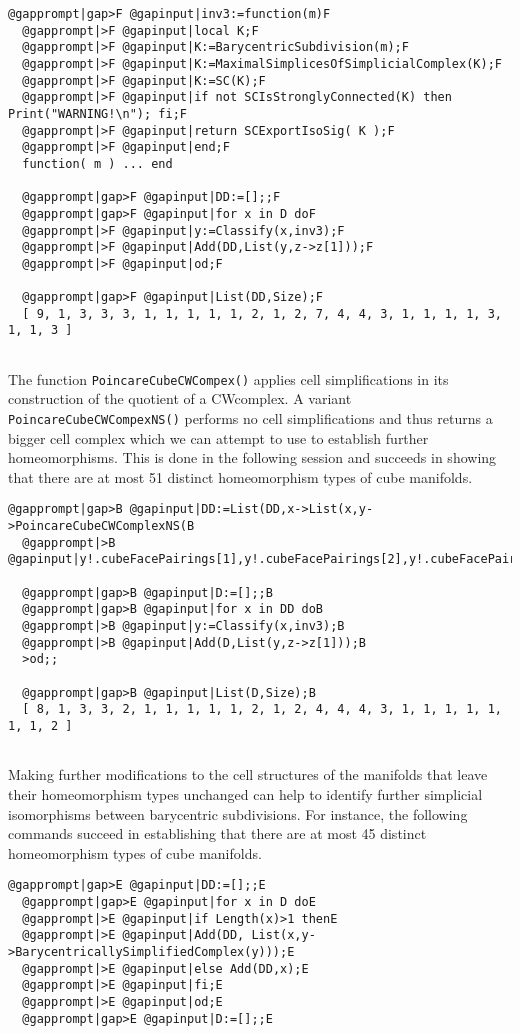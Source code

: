 \documentclass[a4paper,11pt]{report}
\begin{document}
{{\begin{Verbatim}[commandchars=@|F,fontsize=\small,frame=single,label=Example]
  @gapprompt|gap>F @gapinput|inv3:=function(m)F
  @gapprompt|>F @gapinput|local K;F
  @gapprompt|>F @gapinput|K:=BarycentricSubdivision(m);F
  @gapprompt|>F @gapinput|K:=MaximalSimplicesOfSimplicialComplex(K);F
  @gapprompt|>F @gapinput|K:=SC(K);F
  @gapprompt|>F @gapinput|if not SCIsStronglyConnected(K) then Print("WARNING!\n"); fi;F
  @gapprompt|>F @gapinput|return SCExportIsoSig( K );F
  @gapprompt|>F @gapinput|end;F
  function( m ) ... end
  
  @gapprompt|gap>F @gapinput|DD:=[];;F
  @gapprompt|gap>F @gapinput|for x in D doF
  @gapprompt|>F @gapinput|y:=Classify(x,inv3);F
  @gapprompt|>F @gapinput|Add(DD,List(y,z->z[1]));F
  @gapprompt|>F @gapinput|od;F
  
  @gapprompt|gap>F @gapinput|List(DD,Size);F
  [ 9, 1, 3, 3, 3, 1, 1, 1, 1, 1, 2, 1, 2, 7, 4, 4, 3, 1, 1, 1, 1, 3, 1, 1, 3 ]
  
\end{Verbatim}
 The function \texttt{PoincareCubeCWCompex()} applies cell simplifications in its construction of the quotient of a
CW\texttt{}complex. A variant \texttt{PoincareCubeCWCompexNS()} performs no cell simplifications and thus returns a bigger cell complex which
we can attempt to use to establish further homeomorphisms. This is done in the
following session and succeeds in showing that there are at most 51 distinct
homeomorphism types of cube manifolds. 
\begin{Verbatim}[commandchars=@|B,fontsize=\small,frame=single,label=Example]
  @gapprompt|gap>B @gapinput|DD:=List(DD,x->List(x,y->PoincareCubeCWComplexNS(B
  @gapprompt|>B @gapinput|y!.cubeFacePairings[1],y!.cubeFacePairings[2],y!.cubeFacePairings[3])));;B
  
  @gapprompt|gap>B @gapinput|D:=[];;B
  @gapprompt|gap>B @gapinput|for x in DD doB
  @gapprompt|>B @gapinput|y:=Classify(x,inv3);B
  @gapprompt|>B @gapinput|Add(D,List(y,z->z[1]));B
  >od;;
  
  @gapprompt|gap>B @gapinput|List(D,Size);B
  [ 8, 1, 3, 3, 2, 1, 1, 1, 1, 1, 2, 1, 2, 4, 4, 4, 3, 1, 1, 1, 1, 1, 1, 1, 2 ]
  
\end{Verbatim}
 Making further modifications to the cell structures of the manifolds that
leave their homeomorphism types unchanged can help to identify further
simplicial isomorphisms between barycentric subdivisions. For instance, the
following commands succeed in establishing that there are at most 45 distinct
homeomorphism types of cube manifolds. 
\begin{Verbatim}[commandchars=@|E,fontsize=\small,frame=single,label=Example]
  @gapprompt|gap>E @gapinput|DD:=[];;E
  @gapprompt|gap>E @gapinput|for x in D doE
  @gapprompt|>E @gapinput|if Length(x)>1 thenE
  @gapprompt|>E @gapinput|Add(DD, List(x,y->BarycentricallySimplifiedComplex(y)));E
  @gapprompt|>E @gapinput|else Add(DD,x);E
  @gapprompt|>E @gapinput|fi;E
  @gapprompt|>E @gapinput|od;E
  @gapprompt|gap>E @gapinput|D:=[];;E
  

\end{Verbatim}}}
\end{document}
